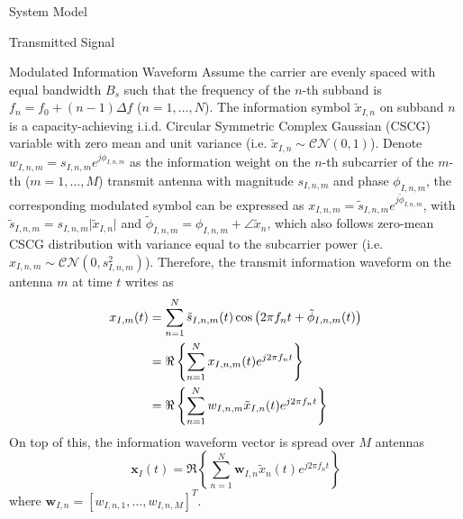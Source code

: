 \documentclass{IEEEtran}
\begin{document}
\begin{section} {System Model}
\begin{subsection} {Transmitted Signal}
            \begin{subsubsection} {Modulated Information Waveform}
                Assume the carrier are evenly spaced with equal bandwidth $B_s$ such that the frequency of the $n$-th subband is $f_n = f_0+(n-1) \Delta f$ ($n = 1,\dots,N$). The information symbol $\tilde{x}_{I,n}$ on subband $n$ is a capacity-achieving i.i.d. Circular Symmetric Complex Gaussian (CSCG) variable with zero mean and unit variance (i.e. $\tilde{x}_{I,n} \sim \mathcal{CN}(0,1)$). Denote $w_{I,n,m} = s_{I,n,m} e^{j\phi_{I,n,m}}$ as the information weight on the $n$-th subcarrier of the $m$-th ($m = 1,\dots,M$) transmit antenna with magnitude $s_{I,n,m}$ and phase $\phi_{I,n,m}$, the corresponding modulated symbol can be expressed as $x_{I,n,m} = \tilde{s}_{I,n,m} e^{j\tilde{\phi}_{I,n,m}}$, with $\tilde{s}_{I,n,m} = s_{I,n,m} \lvert\tilde{x}_{I,n}\rvert$ and $\tilde{\phi}_{I,n,m} = \phi_{I,n,m} + \angle{\tilde{x}_n}$, which also follows zero-mean CSCG distribution with variance equal to the subcarrier power (i.e. $x_{I,n,m} \sim \mathcal{CN}(0,s_{I,n,m}^2)$). Therefore, the transmit information waveform on the antenna $m$ at time $t$ writes as
                \begin{equation} \label{eq:x_{I,m}(t)}
                    \begin{split}
                        x_{I,m}(t)
                        &= \sum_{n=1}^{N} \tilde{s}_{I,n,m}(t) \cos \left( 2 \pi f_n t + \tilde{\phi}_{I,n,m}(t) \right) \\
                        &= \Re \left\{ \sum_{n=1}^{N} x_{I,n,m}(t) e^{j2 \pi f_n t} \right\} \\
                        &= \Re \left\{ \sum_{n=1}^{N} w_{I,n,m} \tilde{x}_{I,n}(t) e^{j2 \pi f_n t} \right\}
                    \end{split}
                \end{equation}
                On top of this, the information waveform vector is spread over $M$ antennas
                \begin{equation} \label{eq:x_I(t)}
                    \boldsymbol{x}_I(t) = \Re \left\{ \sum_{n=1}^{N} \boldsymbol{w}_{I,n}\tilde{x}_n(t) e^{j2{\pi}{f_n}t} \right\}
                \end{equation}
                where $\boldsymbol{w}_{I,n}=[w_{I,n,1},\dots,w_{I,n,M}]^T$.
            \end{subsubsection}


\end{subsection}
\end{section}
\end{document}

